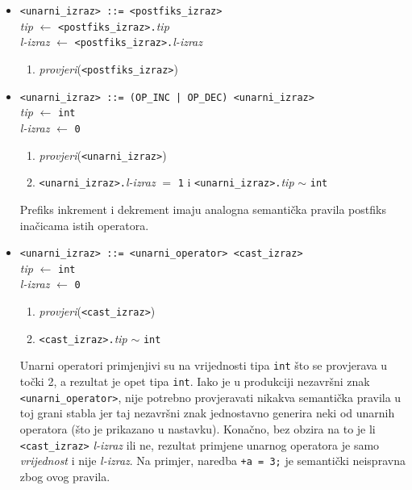 \documentclass[times, 12pt, utf8]{book}
\begin{document}
\begin{itemize}

\item
\verb|<unarni_izraz> ::= <postfiks_izraz>|\\
\emph{tip} \(\leftarrow\) \verb|<postfiks_izraz>.|\emph{tip}\\
\emph{l-izraz} \(\leftarrow\) \verb|<postfiks_izraz>.|\emph{l-izraz}
\begin{enumerate}
\item
\emph{provjeri}(\verb|<postfiks_izraz>|)
\end{enumerate}

\item
\verb#<unarni_izraz> ::= (OP_INC | OP_DEC) <unarni_izraz>#\\
\emph{tip} \(\leftarrow\) \verb|int|\\
\emph{l-izraz} \(\leftarrow\) \verb|0|
\begin{enumerate}
\item
\emph{provjeri}(\verb|<unarni_izraz>|)
\item
\verb|<unarni_izraz>.|\emph{l-izraz} \(=\) \verb|1| i \verb|<unarni_izraz>.|\emph{tip} \(\sim\) \verb|int|
\end{enumerate}

Prefiks inkrement i dekrement imaju analogna semantička pravila postfiks inačicama istih operatora.

\item
\verb|<unarni_izraz> ::= <unarni_operator> <cast_izraz>|\\
\emph{tip} \(\leftarrow\) \verb|int|\\
\emph{l-izraz} \(\leftarrow\) \verb|0|
\begin{enumerate}
\item
\emph{provjeri}(\verb|<cast_izraz>|)
\item
\verb|<cast_izraz>.|\emph{tip} \(\sim\) \verb|int|
\end{enumerate}

Unarni operatori primjenjivi su na vrijednosti tipa \verb|int| što se provjerava u točki 2, a rezultat je opet tipa \verb|int|.
Iako je u produkciji nezavršni znak \verb|<unarni_operator>|, nije potrebno provjeravati nikakva semantička pravila u toj grani stabla jer taj nezavršni znak jednostavno generira neki od unarnih operatora (što je prikazano u nastavku).
Konačno, bez obzira na to je li \verb|<cast_izraz>| \emph{l-izraz} ili ne, rezultat primjene unarnog operatora je samo \emph{vrijednost} i nije \emph{l-izraz}.
Na primjer, naredba \verb|+a = 3;| je semantički neispravna zbog ovog pravila.

\end{itemize}
\end{document}
